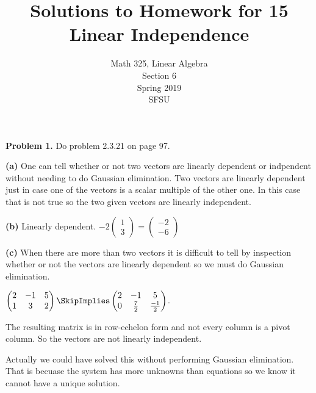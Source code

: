 \documentclass[oneside,12pt]{amsart}
\begin{document}
\title{Solutions to Homework for 15 \\ Linear Independence}
\author{Math 325, Linear Algebra \\ Section 6\\ Spring 2019 \\ SFSU }
\date{}

\maketitle


\textbf{Problem 1.} Do problem 2.3.21 on page 97.

\bigskip

\textbf{(a)} One can tell whether or not two vectors are linearly dependent
or indpendent without needing to do Gaussian elimination. Two vectors are
linearly dependent just in case one of the vectors is a scalar multiple of
the other one. In this case that is not true so the two given vectors
are linearly independent.

\bigskip

\textbf{(b)}  Linearly dependent.
$
-2
\begin{pmatrix}
1 \\ 3
\end{pmatrix}
=
\begin{pmatrix}
-2 \\ -6
\end{pmatrix}
$

\bigskip

\textbf{(c)} When there are more than two vectors it is difficult to tell
by inspection whether or not the vectors are linearly dependent so we must
do Gaussian elimination.

$
\begin{pmatrix}
2 & -1 & 5 \\
1 & 3 & 2
\end{pmatrix}
\SkipImplies
\begin{pmatrix}
2 & -1 & 5 \\
0 & \frac{7}{2} & \frac{-1}{2}
\end{pmatrix}
$.

The resulting matrix is in row-echelon form and not every column is a pivot
column. So the vectors are not linearly independent.

Actually we could have solved this without performing Gaussian elimination.
That is becuase the system has more unknowns than equations so we know
it cannot have a unique solution.

\bigskip
\end{document}
